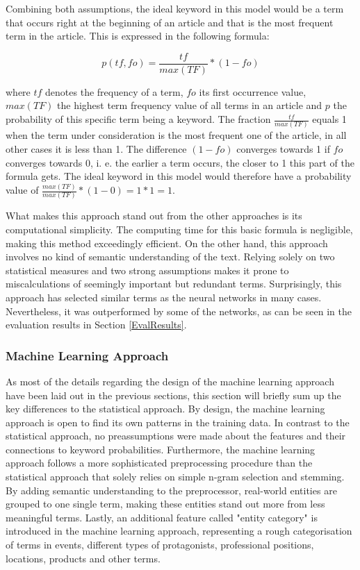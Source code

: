 \documentclass[11pt,a4paper,twoside]{article}
\begin{document}
\noindent Combining both assumptions, the ideal keyword in this model would be a term that occurs right at the beginning of an article and that is the most frequent term in the article. This is expressed in the following formula:

\[
p(tf, fo) = \frac{tf}{max(TF)} * (1 - fo)
\]

\noindent where $tf$ denotes the frequency of a term, $fo$ its first occurrence value, $max(TF)$ the highest term frequency value of all terms in an article and $p$ the probability of this specific term being a keyword. The fraction $\frac{tf}{max(TF)}$ equals 1 when the term under consideration is the most frequent one of the article, in all other cases it is less than 1. The difference $(1 - fo)$ converges towards 1 if $fo$ converges towards 0, i. e. the earlier a term occurs, the closer to 1 this part of the formula gets. The ideal keyword in this model would therefore have a probability value of $\frac{max(TF)}{max(TF)} * (1 - 0) = 1 * 1 = 1$.

What makes this approach stand out from the other approaches is its computational simplicity. The computing time for this basic formula is negligible, making this method exceedingly efficient. On the other hand, this approach involves no kind of semantic understanding of the text. Relying solely on two statistical measures and two strong assumptions makes it prone to miscalculations of seemingly important but redundant terms. Surprisingly, this approach has selected similar terms as the neural networks in many cases. Nevertheless, it was outperformed by some of the networks, as can be seen in the evaluation results in Section \ref{EvalResults}.

\subsubsection{Machine Learning Approach} \label{SystemClassificationML}

As most of the details regarding the design of the machine learning approach have been laid out in the previous sections, this section will briefly sum up the key differences to the statistical approach. By design, the machine learning approach is open to find its own patterns in the training data. In contrast to the statistical approach, no preassumptions were made about the features and their connections to keyword probabilities. Furthermore, the machine learning approach follows a more sophisticated preprocessing procedure than the statistical approach that solely relies on simple n-gram selection and stemming. By adding semantic understanding to the preprocessor, real-world entities are grouped to one single term, making these entities stand out more from less meaningful terms. Lastly, an additional feature called "entity category" is introduced in the machine learning approach, representing a rough categorisation of terms in events, different types of protagonists, professional positions, locations, products and other terms.
\end{document}
